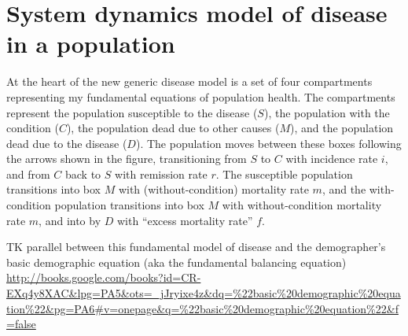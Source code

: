 \section{System dynamics model of disease in a population}
At the heart of the new generic disease model is a set of four
compartments representing my fundamental equations of population
health. The compartments represent the population susceptible to the
disease ($S$), the population with the condition ($C$), the population
dead due to other causes ($M$), and the population dead due to the
disease ($D$). The population moves between these boxes following the
arrows shown in the figure, transitioning from $S$ to $C$ with incidence
rate $i$, and from $C$ back to $S$ with remission rate $r$. The susceptible
population transitions into box $M$ with (without-condition) mortality
rate $m$, and the with-condition population transitions into box $M$ with
without-condition mortality rate $m$, and into by $D$ with ``excess
mortality rate'' $f$.

TK parallel between this fundamental model of disease and the demographer's
 basic demographic equation (aka the fundamental balancing equation)
 \url{http://books.google.com/books?id=CR-EXq4y8XAC&lpg=PA5&ots=_jJryixe4z&dq=%22basic%20demographic%20equation%22&pg=PA6#v=onepage&q=%22basic%20demographic%20equation%22&f=false}


